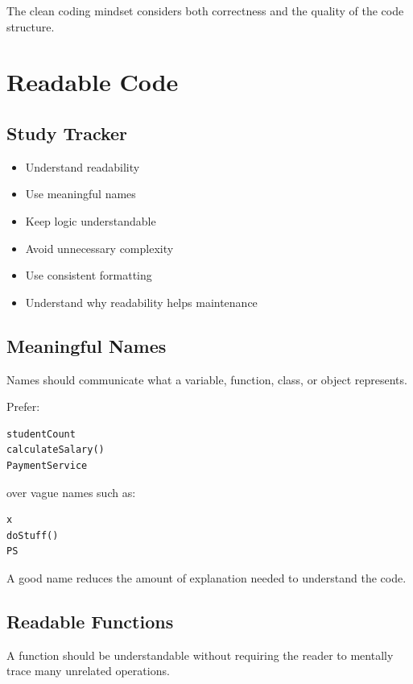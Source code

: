 \documentclass[11pt,a4paper]{article}
\newcommand{\checkitem}{$\square$}
\begin{document}
The clean coding mindset considers both correctness and the quality of the
code structure.

\section{Readable Code}

\subsection{Study Tracker}

\begin{itemize}[label=\checkitem]
    \item Understand readability
    \item Use meaningful names
    \item Keep logic understandable
    \item Avoid unnecessary complexity
    \item Use consistent formatting
    \item Understand why readability helps maintenance
\end{itemize}

\subsection{Meaningful Names}

Names should communicate what a variable, function, class, or object represents.

Prefer:

\begin{verbatim}
studentCount
calculateSalary()
PaymentService
\end{verbatim}

over vague names such as:

\begin{verbatim}
x
doStuff()
PS
\end{verbatim}

A good name reduces the amount of explanation needed to understand the code.

\subsection{Readable Functions}

A function should be understandable without requiring the reader to mentally
trace many unrelated operations.
\end{document}
